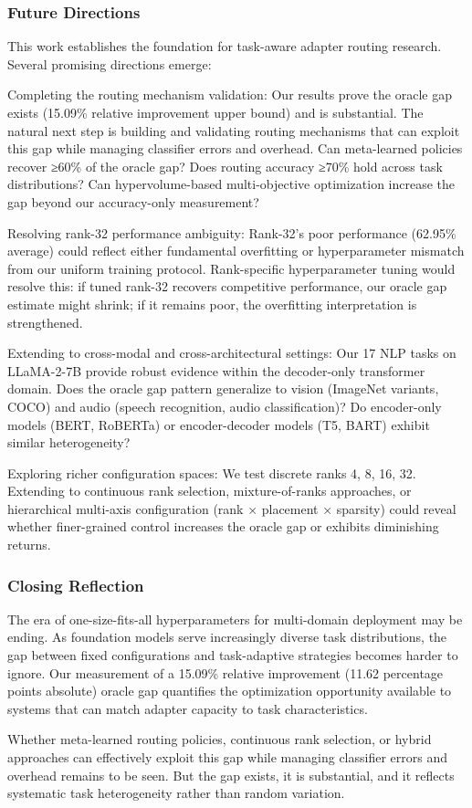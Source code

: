 \subsubsection{Future Directions}

This work establishes the foundation for task-aware adapter routing research. Several promising directions emerge:

Completing the routing mechanism validation: Our results prove the oracle gap exists (15.09\% relative improvement upper bound) and is substantial. The natural next step is building and validating routing mechanisms that can exploit this gap while managing classifier errors and overhead. Can meta-learned policies recover ≥60\% of the oracle gap? Does routing accuracy ≥70\% hold across task distributions? Can hypervolume-based multi-objective optimization increase the gap beyond our accuracy-only measurement?

Resolving rank-32 performance ambiguity: Rank-32's poor performance (62.95\% average) could reflect either fundamental overfitting or hyperparameter mismatch from our uniform training protocol. Rank-specific hyperparameter tuning would resolve this: if tuned rank-32 recovers competitive performance, our oracle gap estimate might shrink; if it remains poor, the overfitting interpretation is strengthened.

Extending to cross-modal and cross-architectural settings: Our 17 NLP tasks on LLaMA-2-7B provide robust evidence within the decoder-only transformer domain. Does the oracle gap pattern generalize to vision (ImageNet variants, COCO) and audio (speech recognition, audio classification)? Do encoder-only models (BERT, RoBERTa) or encoder-decoder models (T5, BART) exhibit similar heterogeneity?

Exploring richer configuration spaces: We test discrete ranks {4, 8, 16, 32}. Extending to continuous rank selection, mixture-of-ranks approaches, or hierarchical multi-axis configuration (rank × placement × sparsity) could reveal whether finer-grained control increases the oracle gap or exhibits diminishing returns.

\subsubsection{Closing Reflection}

The era of one-size-fits-all hyperparameters for multi-domain deployment may be ending. As foundation models serve increasingly diverse task distributions, the gap between fixed configurations and task-adaptive strategies becomes harder to ignore. Our measurement of a 15.09\% relative improvement (11.62 percentage points absolute) oracle gap quantifies the optimization opportunity available to systems that can match adapter capacity to task characteristics.

Whether meta-learned routing policies, continuous rank selection, or hybrid approaches can effectively exploit this gap while managing classifier errors and overhead remains to be seen. But the gap exists, it is substantial, and it reflects systematic task heterogeneity rather than random variation.
